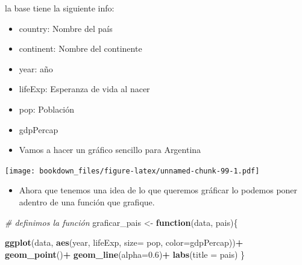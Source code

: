 \documentclass[]{book}
\newenvironment{Shaded}{\begin{snugshade}}{\end{snugshade}}
\newcommand{\CommentTok}[1]{\textcolor[rgb]{0.56,0.35,0.01}{\textit{#1}}}
\newcommand{\ControlFlowTok}[1]{\textcolor[rgb]{0.13,0.29,0.53}{\textbf{#1}}}
\newcommand{\DataTypeTok}[1]{\textcolor[rgb]{0.13,0.29,0.53}{#1}}
\newcommand{\FloatTok}[1]{\textcolor[rgb]{0.00,0.00,0.81}{#1}}
\newcommand{\KeywordTok}[1]{\textcolor[rgb]{0.13,0.29,0.53}{\textbf{#1}}}
\newcommand{\NormalTok}[1]{#1}
\newcommand{\OperatorTok}[1]{\textcolor[rgb]{0.81,0.36,0.00}{\textbf{#1}}}
\newcommand{\StringTok}[1]{\textcolor[rgb]{0.31,0.60,0.02}{#1}}
\providecommand{\tightlist}{%
  \setlength{\itemsep}{0pt}\setlength{\parskip}{0pt}}
\begin{document}
la base tiene la siguiente info:

\begin{itemize}
\item
  country: Nombre del país
\item
  continent: Nombre del continente
\item
  year: año
\item
  lifeExp: Esperanza de vida al nacer
\item
  pop: Población
\item
  gdpPercap
\item
  Vamos a hacer un gráfico sencillo para Argentina
\end{itemize}

\begin{Shaded}
\end{Shaded}

\texttt{[image: bookdown\_files/figure-latex/unnamed-chunk-99-1.pdf]}

\begin{itemize}
\tightlist
\item
  Ahora que tenemos una idea de lo que queremos gráficar lo podemos poner adentro de una función que grafique.
\end{itemize}

\begin{Shaded}
\begin{Highlighting}[]
\CommentTok{# definimos la función}
\NormalTok{graficar_pais <-}\StringTok{ }\ControlFlowTok{function}\NormalTok{(data, pais)\{}
  
  \KeywordTok{ggplot}\NormalTok{(data, }\KeywordTok{aes}\NormalTok{(year, lifeExp, }\DataTypeTok{size=}\NormalTok{ pop, }\DataTypeTok{color=}\NormalTok{gdpPercap))}\OperatorTok{+}
\StringTok{    }\KeywordTok{geom_point}\NormalTok{()}\OperatorTok{+}
\StringTok{    }\KeywordTok{geom_line}\NormalTok{(}\DataTypeTok{alpha=}\FloatTok{0.6}\NormalTok{)}\OperatorTok{+}
\StringTok{    }\KeywordTok{labs}\NormalTok{(}\DataTypeTok{title =}\NormalTok{ pais)}
\NormalTok{\}}
\end{Highlighting}
\end{Shaded}
\end{document}
